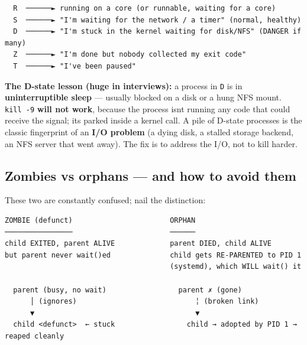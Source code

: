 \documentclass[11pt]{article}
\newenvironment{Shaded}{\begin{snugshade}}{\end{snugshade}}
\newcommand{\AttributeTok}[1]{\textcolor[rgb]{0.16,0.50,0.73}{#1}}
\newcommand{\CommentTok}[1]{\textcolor[rgb]{0.48,0.49,0.49}{#1}}
\newcommand{\FunctionTok}[1]{\textcolor[rgb]{0.56,0.27,0.68}{#1}}
\newcommand{\KeywordTok}[1]{\textcolor[rgb]{0.81,0.81,0.76}{\textbf{#1}}}
\newcommand{\NormalTok}[1]{\textcolor[rgb]{0.81,0.81,0.76}{#1}}
\newcommand{\StringTok}[1]{\textcolor[rgb]{0.96,0.31,0.31}{#1}}
\begin{document}
\begin{verbatim}
  R  ──────► running on a core (or runnable, waiting for a core)
  S  ──────► "I'm waiting for the network / a timer" (normal, healthy)
  D  ──────► "I'm stuck in the kernel waiting for disk/NFS" (DANGER if many)
  Z  ──────► "I'm done but nobody collected my exit code"
  T  ──────► "I've been paused"
\end{verbatim}

\textbf{The D-state lesson (huge in interviews):} a process in \texttt{D} is in \textbf{uninterruptible sleep} --- usually blocked on a disk or a hung NFS mount. \texttt{kill\ -9} \textbf{will not work}, because the process isn\textquotesingle t running any code that could receive the signal; it\textquotesingle s parked inside a kernel call. A pile of D-state processes is the classic fingerprint of an \textbf{I/O problem} (a dying disk, a stalled storage backend, an NFS server that went away). The fix is to address the I/O, not to kill harder.


\begin{Shaded}
\end{Shaded}

\subsection{Zombies vs orphans --- and how to avoid them}\label{zombies-vs-orphans--and-how-to-avoid-them}

These two are constantly confused; nail the distinction:

\setcodelang{}

\begin{verbatim}
ZOMBIE (defunct)                       ORPHAN
────────────────                       ──────
child EXITED, parent ALIVE             parent DIED, child ALIVE
but parent never wait()ed              child gets RE-PARENTED to PID 1
                                       (systemd), which WILL wait() it

  parent (busy, no wait)                 parent ✗ (gone)
      │ (ignores)                            ╎ (broken link)
      ▼                                      ▼
  child <defunct>  ← stuck                 child → adopted by PID 1 → reaped cleanly
\end{verbatim}
\end{document}
